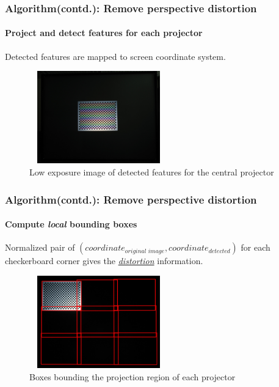\documentclass{beamer}
\begin{document}

\begin{frame}
\frametitle{Algorithm(contd.): Remove perspective distortion}
\framesubtitle{Project and detect features for each projector}
Detected features are mapped to screen coordinate system.

\begin{figure}
\includegraphics[width=6cm, height=4cm]{figures/detected_corners.jpg}
\caption{Low exposure image of detected features for the central projector}
\end{figure}

\end{frame}


\begin{frame}
\frametitle{Algorithm(contd.): Remove perspective distortion}
\framesubtitle{Compute \textit{local} bounding boxes}
Normalized pair of $(coordinate_{\textit{original image}}, coordinate_{\textit{detected}})$ for each checkerboard corner gives the \textit{\hyperlink{concept}{distortion}} information.
\begin{figure}
\includegraphics[width=6cm,height=4cm]{figures/all_bboxes.jpg}
\caption{Boxes bounding the projection region of each projector}
\end{figure}

\end{frame}

\end{document}
